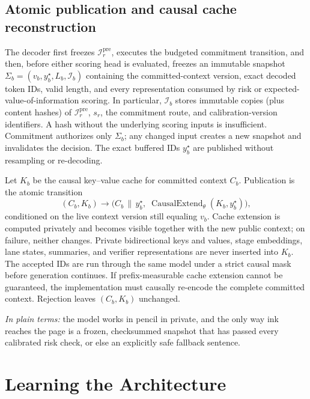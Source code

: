 \documentclass[10pt,a4paper]{article}
\newcommand{\op}[1]{\operatorname{#1}}
\newcommand{\Ical}{\mathcal{I}}
\begin{document}
\subsection{Atomic publication and causal cache reconstruction}

The decoder first freezes $\Ical^{\mathrm{pre}}_r$, executes the budgeted
commitment transition, and then, before either scoring head is
evaluated, freezes an immutable snapshot
$\Sigma_b = ( v_b, y^\star_b, L_b, \Ical_b )$ containing the committed-context
version, exact decoded token IDs, valid length, and every representation
consumed by risk or expected-value-of-information scoring. In particular,
$\Ical_b$ stores immutable copies (plus content hashes) of
$\Ical^{\mathrm{pre}}_r$, $s_r$, the commitment route, and calibration-version
identifiers. A hash without the underlying scoring inputs is insufficient.
Commitment authorizes only $\Sigma_b$; any changed input creates a new
snapshot and invalidates the decision. The exact buffered IDs $y^\star_b$ are
published without resampling or re-decoding.

Let $K_b$ be the causal key--value cache for committed context $C_b$.
Publication is the atomic transition
\begin{equation}
(C_b, K_b) \longrightarrow
\bigl( C_b \,\|\, y^\star_b,\;
\op{CausalExtend}_\theta( K_b, y^\star_b ) \bigr),
\end{equation}
conditioned on the live context version still equaling $v_b$. Cache extension
is computed privately and becomes visible together with the new public
context; on failure, neither changes. Private bidirectional keys and values,
stage embeddings, lane states, summaries, and verifier representations are
never inserted into $K_b$. The accepted IDs are run through the same model
under a strict causal mask before generation continues. If prefix-measurable
cache extension cannot be guaranteed, the implementation must causally
re-encode the complete committed context. Rejection leaves $(C_b, K_b)$
unchanged.

\emph{In plain terms:} the model works in pencil in private, and the only way
ink reaches the page is a frozen, checksummed snapshot that has passed every
calibrated risk check, or else an explicitly safe fallback sentence.

\section{Learning the Architecture}
\label{sec:learning}
\end{document}
